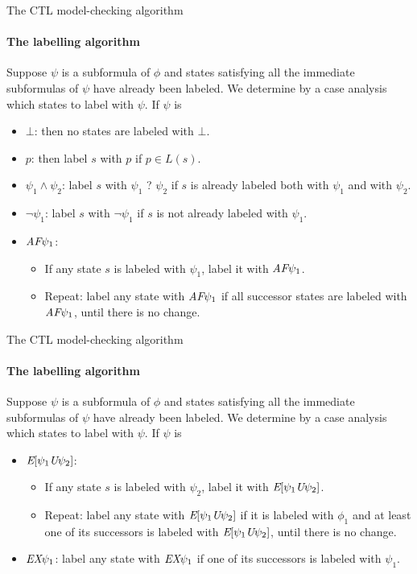 \begin{frame}{The CTL model-checking algorithm}
	\framesubtitle{The labelling algorithm}
	Suppose $\psi$ is a subformula of $\phi$ and states satisfying all the immediate subformulas of $\psi$ have already been labeled. We determine by a case analysis which states to label with $\psi$. If $\psi$ is
	
	\begin{itemize}
		\item
		{
			$\bot$: then no states are labeled with $\bot$.
			\pause
		}
		\item
		{
			$p$: then label $s$ with $p$ if $p \in L(s)$.
			\pause
		}
		\item
		{
			$\psi_{1} \land \psi_{2}$: label $s$ with $\psi_{1}$ ? $\psi_{2}$ if $s$ is already labeled both with $\psi_{1}$ and with $\psi_{2}$.
			\pause
		}
		\item
		{
			$\neg \psi_{1}$: label $s$ with $\neg \psi_{1}$ if $s$ is not already labeled with $\psi_{1}$.
			\pause
		}
		\item
		{
			$\textit{A}\textit{F} \psi_{1}$:
			\begin{itemize}
				\item If any state $s$ is labeled with $\psi_{1}$, label it with $\textit{A}\textit{F} \psi_{1}$.
				\item Repeat: label any state with $\textit{A}\textit{F} \psi_{1}$ if all successor states are labeled with $\textit{A}\textit{F} \psi_{1}$, until there is no change.
			\end{itemize} 
		}
	\end{itemize} 
\end{frame}

\begin{frame}{The CTL model-checking algorithm}
	\framesubtitle{The labelling algorithm}
	Suppose $\psi$ is a subformula of $\phi$ and states satisfying all the immediate subformulas of $\psi$ have already been labeled. We determine by a case analysis which states to label with $\psi$. If $\psi$ is
	
	\begin{itemize}
		\item
		{
			$\textit{E}[\psi_{1} \textit{U} \psi_{2}]$:
			\begin{itemize}
				\item If any state $s$ is labeled with $\psi_{2}$, label it with $\textit{E}[\psi_{1} \textit{U} \psi_{2}]$.
				\item Repeat: label any state with $\textit{E}[\psi_{1} \textit{U} \psi_{2}]$ if it is labeled with $\phi_{1}$ and at least
				one of its successors is labeled with $\textit{E}[\psi_{1} \textit{U} \psi_{2}]$, until there is no change.
			\end{itemize}
			\pause
		}
		\item
		{
			$\textit{E}\textit{X} \psi_{1}$: label any state with $\textit{E}\textit{X} \psi_{1}$ if one of its successors is labeled with $\psi_{1}$.
		}
	\end{itemize}
\end{frame}

